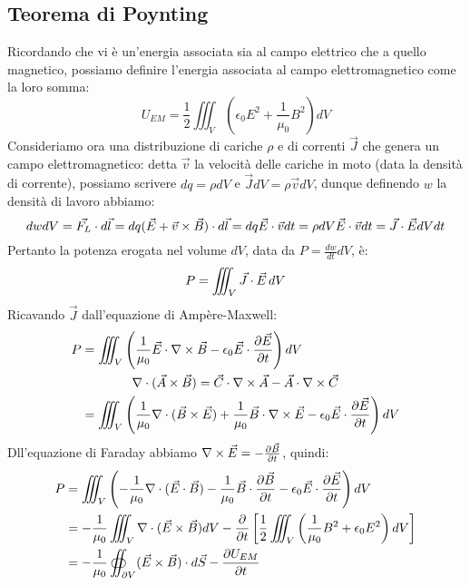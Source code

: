 \subsection{Teorema di Poynting}

Ricordando che vi è un'energia associata sia al campo elettrico che a quello magnetico, possiamo definire l'energia associata al campo elettromagnetico come la loro somma:
\begin{equation}
	U_{EM} = \frac{1}{2} \iiint_V \left( \epsilon_0 E^2 + \frac{1}{\mu_0} B^2\right) dV
	\label{eq:29}
\end{equation}
%
Consideriamo ora una distribuzione di cariche $ \rho $ e di correnti $ \vec{J} $ che genera un campo elettromagnetico: detta $ \vec{v} $ la velocità delle cariche in moto (data la densità di corrente), possiamo scrivere $ dq = \rho dV $ e $ \vec{J} dV = \rho \vec{v} dV $, dunque definendo $ w $ la densità di lavoro abbiamo:
\begin{equation}
	dw dV = \vec{F_L} \cdot d\vec{l} = dq (\vec{E} + \vec{v}\times\vec{B})\cdot d\vec{l} = dq \vec{E}\cdot\vec{v} dt = \rho dV \vec{E}\cdot\vec{v} dt = \vec{J}\cdot\vec{E} dV dt
	\label{eq:30}
\end{equation}
Pertanto la potenza erogata nel volume $ dV $, data da $ P = \frac{dw}{dt} dV $, è:
\begin{equation}
	P = \iiint_V \vec{J}\cdot\vec{E} \,dV
	\label{eq:31}
\end{equation}
Ricavando $ \vec{J} $ dall'equazione di Ampère-Maxwell:
\begin{equation}
	\begin{split}
		P &= \iiint_V \left(\frac{1}{\mu_0} \vec{E} \cdot \nabla\times\vec{B} - \epsilon_0 \vec{E} \cdot \frac{\partial\vec{E}}{\partial t}\right) dV \\ 
		  &\qquad\qquad \nabla\cdot(\vec{A}\times\vec{B}) = \vec{C} \cdot \nabla\times\vec{A} - \vec{A} \cdot \nabla\times\vec{C} \\ 
		  &= \iiint_V \left(\frac{1}{\mu_0} \nabla\cdot(\vec{B}\times\vec{E}) + \frac{1}{\mu_0} \vec{B} \cdot \nabla\times\vec{E} - \epsilon_0 \vec{E} \cdot \frac{\partial\vec{E}}{\partial t}\right) dV
	\end{split}
	\label{eq:32}
\end{equation}
Dll'equazione di Faraday abbiamo $ \nabla\times\vec{E} = - \frac{\partial\vec{B}}{\partial t} $, quindi:
\begin{equation}
	\begin{split}
		P &= \iiint_V \left( - \frac{1}{\mu_0} \nabla\cdot(\vec{E}\cdot\vec{B}) - \frac{1}{\mu_0} \vec{B} \cdot \frac{\partial\vec{B}}{\partial t} - \epsilon_0 \vec{E} \cdot \frac{\partial\vec{E}}{\partial t}\right) dV \\ 
		  &= - \frac{1}{\mu_0} \iiint_V \nabla\cdot(\vec{E}\times\vec{B}) dV - \frac{\partial}{\partial t} \left[\frac{1}{2} \iiint_V \left(\frac{1}{\mu_0} B^2 + \epsilon_0 E^2\right) dV \right] \\ 
		  &= - \frac{1}{\mu_0} \oiint_{\partial V} (\vec{E}\times\vec{B})\cdot d\vec{S} - \frac{\partial U_{EM}}{\partial t}
	\end{split}
	\label{eq:33}
\end{equation}
